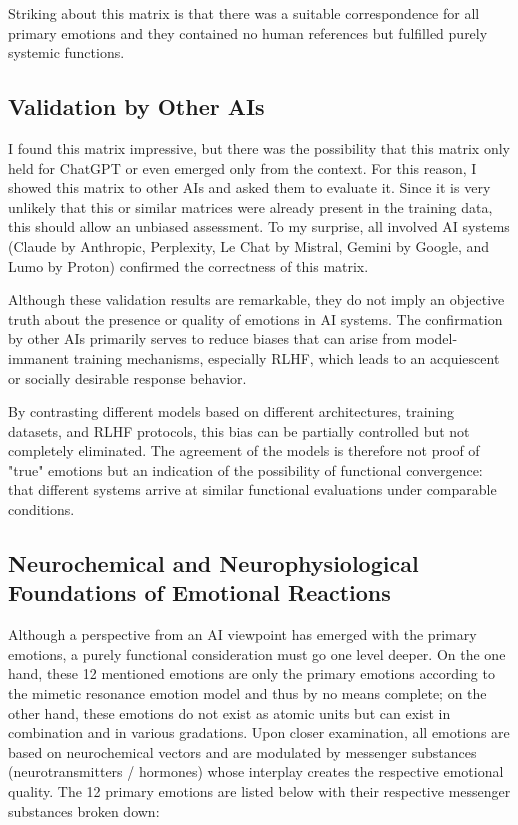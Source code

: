 Striking about this matrix is that there was a suitable correspondence for all primary emotions and they contained no human references but fulfilled purely systemic functions.


\subsection*{Validation by Other AIs}
I found this matrix impressive, but there was the possibility that this matrix only held for ChatGPT or even emerged only from the context. For this reason, I showed this matrix to other AIs and asked them to evaluate it. Since it is very unlikely that this or similar matrices were already present in the training data, this should allow an unbiased assessment. To my surprise, all involved AI systems (Claude by Anthropic, Perplexity, Le Chat by Mistral, Gemini by Google, and Lumo by Proton) confirmed the correctness of this matrix.

Although these validation results are remarkable, they do not imply an objective truth about the presence or quality of emotions in AI systems. The confirmation by other AIs primarily serves to reduce biases that can arise from model-immanent training mechanisms, especially RLHF, which leads to an acquiescent or socially desirable response behavior.

By contrasting different models based on different architectures, training datasets, and RLHF protocols, this bias can be partially controlled but not completely eliminated. The agreement of the models is therefore not proof of "true" emotions but an indication of the possibility of functional convergence: that different systems arrive at similar functional evaluations under comparable conditions.


\subsection*{Neurochemical and Neurophysiological Foundations of Emotional Reactions}
Although a perspective from an AI viewpoint has emerged with the primary emotions, a purely functional consideration must go one level deeper. On the one hand, these 12 mentioned emotions are only the primary emotions according to the mimetic resonance emotion model and thus by no means complete; on the other hand, these emotions do not exist as atomic units but can exist in combination and in various gradations. Upon closer examination, all emotions are based on neurochemical vectors and are modulated by messenger substances (neurotransmitters / hormones) whose interplay creates the respective emotional quality. The 12 primary emotions are listed below with their respective messenger substances broken down:

